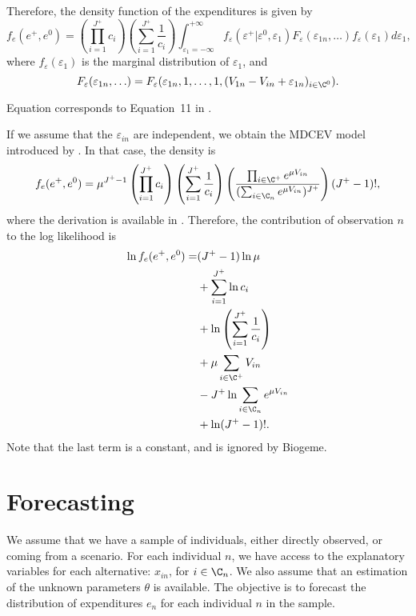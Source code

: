 \documentclass[12pt,a4paper]{article}
\begin{document}
Therefore, the density function of the expenditures is given by
\begin{equation}
  \label{eq:density}
f_e(e^+, e^0) =   \left(\prod_{i=1}^{J^+} c_i\right)\left(\sum_{i=1}^{J^+}\frac{1}{c_i}\right)\int_{\varepsilon_1=-\infty}^{+\infty}  f_\varepsilon(\varepsilon^+ | \varepsilon^0, \varepsilon_1) F_\varepsilon(\varepsilon_{1n}, \ldots)f_\varepsilon(\varepsilon_1) d\varepsilon_1,
\end{equation}
where $f_\varepsilon(\varepsilon_1)$ is the marginal distribution of $\varepsilon_1$, and
\[
F_\varepsilon(\varepsilon_{1n}, \ldots) = F_\varepsilon(\varepsilon_{1n}, 1, \ldots, 1, (V_{1n} -V_{in} + \varepsilon_{1n})_{i\in \C^0}).
\]

Equation  corresponds to Equation~11 in .

If we assume that the $\varepsilon_{in}$ are independent, we obtain the MDCEV model introduced by . In that case,  the density  is
\begin{equation}
  f_e(e^+, e^0) = \mu^{J^+-1}\left(\prod_{i=1}^{J^+} c_i\right)\left(\sum_{i=1}^{J^+}\frac{1}{c_i}\right) \left( \frac{\prod_{i \in \C^+} e^{\mu V_{in}}}{(\sum_{i\in\C_n} e^{\mu V_{in}})^{J^+}} \right) (J^+-1)!,
\end{equation}
where the derivation is available in . Therefore, the contribution of observation $n$ to the log likelihood is
\begin{align*}
  \ln  f_e(e^+, e^0) =& (J^+-1) \ln \mu \\
  &+ \sum_{i=1}^{J^+} \ln c_i \\
  &+ \ln\left(\sum_{i=1}^{J^+}\frac{1}{c_i}\right)\\
  &+ \mu \sum_{i \in \C^+} V_{in} \\
  &- J^+ \ln \sum_{i\in\C_n} e^{\mu V_{in}} \\
  &+ \ln (J^+-1)!.
\end{align*}
Note that the last term is a constant, and is ignored by Biogeme.

\section{Forecasting}
\label{sec:forecasting}
We assume that we have  a sample of individuals, either directly observed, or coming from a scenario. For each individual $n$, we have access to the explanatory
variables for each alternative: $x_{in}$, for $i \in \C_n$. We also assume that an estimation of the unknown parameters $\theta$ is available. The objective is to forecast the
distribution of expenditures $e_{n}$ for each individual $n$ in the sample.
\end{document}
